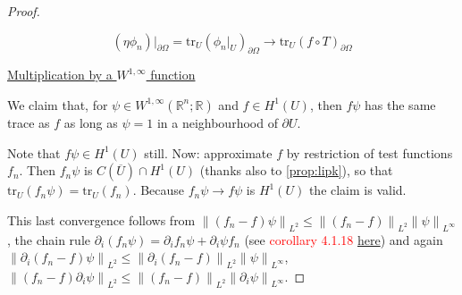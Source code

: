 \documentclass[english,a4paper,9pt,oneside]{scrbook}	%
\theoremstyle{break}
\newenvironment{mproof}[1][\proofname]{%
  \begin{proof}[#1]$ $\par\nobreak\ignorespaces
}{%
  \end{proof}
}
\renewcommand*{\proofname}{Proof}
\theoremstyle{remark}
\newcommand{\mR}{\mathbb{R}}
\newcommand{\norm}[1]{\left\lVert#1\right\rVert}
\newcommand{\tr}{\text{tr}}
\newcommand{\ind}[1]{\{\text{ #1 }\}}
\begin{document}
\begin{appendices}
\begin{mproof}
%

$$(\eta \phi_n)|_{\partial \Omega} = \tr_U( \phi_n|_U)_{\partial \Omega} \rightarrow \tr_U(f \circ T)_{\partial \Omega}$$
%
%
%
%

\underline{Multiplication by a $W^{1,\infty}$ function}

We claim that, for $\psi \in W^{1,\infty}(\mR^n;\mR)$ and $f \in H^1(U)$, then $f\psi$ has the same trace as $f$ as long as $\psi = 1$ in a neighbourhood of $\partial U$.

Note that $f\psi \in H^1(U)$ still. Now: approximate $f$ by restriction of test functions $f_n$. Then $f_n \psi$ is $C(\overline{U})\cap H^1(U)$ (thanks also to \cref{prop:lipk}), so that $\tr_U(f_n\psi) = \tr_U(f_n)$. Because $f_n \psi \rightarrow f \psi$ is $H^1(U)$ the claim is valid.

This last convergence follows from $\norm{(f_n-f)\psi}_{L^2}\leq \norm{(f_n-f)}_{L^2}\norm{\psi}_{L^\infty}$, the chain rule $\partial_i(f_n\psi)=\partial_i f_n \psi + \partial_i \psi f_n$ (see \textcolor{red}{corollary 4.1.18 \href{https://www.math.stonybrook.edu/~joa/PUBLICATIONS/SOBOLEV.pdf}{here}}) and again $\norm{\partial_i(f_n-f)\psi}_{L^2}\leq \norm{\partial_i(f_n-f)}_{L^2}\norm{\psi}_{L^\infty}$, $\norm{(f_n-f)\partial_i\psi}_{L^2}\leq \norm{(f_n-f)}_{L^2}\norm{\partial_i\psi}_{L^\infty}$.


\end{mproof}
\end{appendices}
\end{document}
